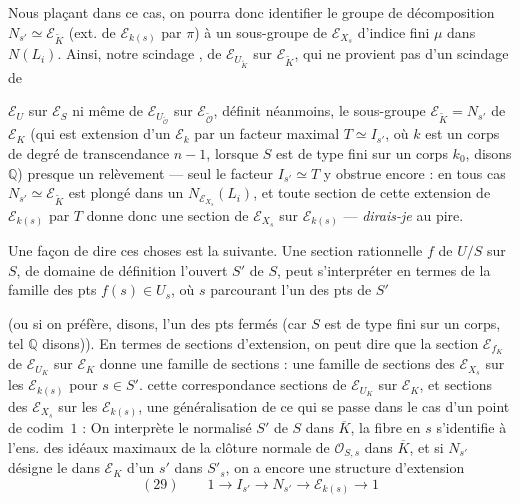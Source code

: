 \documentclass[11pt,a4paper]{article}
\begin{document}
Nous plaçant dans ce cas, on pourra donc identifier le groupe de décomposition
$N_{s'} \simeq \mathcal{E}_{\tilde{K}}$ (ext. de $\mathcal{E}_{k(s)}$ par $\pi$)
à un sous-groupe de $\mathcal{E}_{X_s}$  d'indice fini
$\mu$ dans $N(L_i)$. Ainsi, notre scindage ,  de
$\mathcal{E}_{U_{\tilde{K}}}$ sur $\mathcal{E}_{\tilde{K}}$, qui ne provient
pas d'un scindage de


$\mathcal{E}_U$ sur $\mathcal{E}_S$ ni même de $\mathcal{E}_{U_{\tilde{\mathcal{O}}}}$
sur $\mathcal{E}_{\tilde{\mathcal{O}}}$, définit néanmoins,  le
sous-groupe $\mathcal{E}_{\tilde{K}} = N_{s'}$ de $\mathcal{E}_K$ (qui est
extension d'un $\mathcal{E}_k$ par un facteur \uncertain{\ill{}} maximal
$T \simeq I_{s'}$, où $k$ est un corps de degré de transcendance $n - 1$,
lorsque $S$ est de type fini sur un corps $k_0$, disons $\mathbb{Q}$) presque un
relèvement — seul le facteur $I_{s'} \simeq T$ y obstrue encore : en tous cas
$N_{s'} \simeq \mathcal{E}_{\tilde{K}}$ est plongé dans un
$N_{\mathcal{E}_{X_s}}(L_i)$, et toute section de cette extension de
$\mathcal{E}_{k(s)}$ par $T$ donne donc une section de $\mathcal{E}_{X_s}$ sur
$\mathcal{E}_{k(s)}$ — \emph{dirais-je} au pire.

Une  façon de dire ces choses est la suivante. Une section
rationnelle $f$ de $U/S$ sur $S$, de domaine de définition l'ouvert $S'$ de $S$,
peut s'interpréter en termes de la famille des pts $f(s) \in U_s$, où $s$
parcourant l'un des pts de $S'$

(ou si on préfère, disons, l'un des pts fermés (car $S$ est de type fini sur un
corps, tel $\mathbb{Q}$ disons)). En termes de sections d'extension, on peut dire
que la section $\mathcal{E}_{f_K}$ de $\mathcal{E}_{U_K}$ sur $\mathcal{E}_K$
donne  une famille de sections  : une
famille de sections des $\mathcal{E}_{X_s}$ sur les $\mathcal{E}_{k(s)}$ pour
$s \in S'$.   
\ill{} cette correspondance \ill{} \struck{\ill{}} sections de
$\mathcal{E}_{U_K}$ sur $\mathcal{E}_K$, et sections des $\mathcal{E}_{X_s}$ sur
les $\mathcal{E}_{k(s)}$, une généralisation de ce qui se passe dans le cas d'un
point de codim~$1$ : On interprète le normalisé $S'$ de $S$ dans $\overline{K}$,
la fibre en $s$ s'identifie à l'ens. des idéaux maximaux de la clôture normale
de $\mathcal{O}_{S,s}$ dans $\overline{K}$, et si $N_{s'}$ désigne le
  dans $\mathcal{E}_K$ d'un $s'$ dans
$S'_s$, on a encore une structure d'extension
\[
  (29)\qquad 1 \to I_{s'} \to N_{s'} \to \mathcal{E}_{k(s)} \to 1
\]
\end{document}

